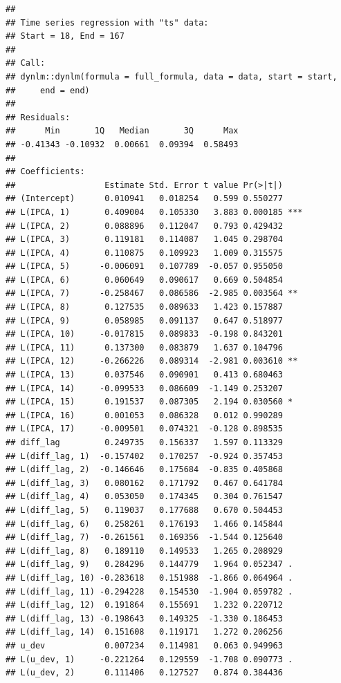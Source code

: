 \documentclass[
]{article}
\begin{document}
\begin{verbatim}
## 
## Time series regression with "ts" data:
## Start = 18, End = 167
## 
## Call:
## dynlm::dynlm(formula = full_formula, data = data, start = start, 
##     end = end)
## 
## Residuals:
##      Min       1Q   Median       3Q      Max 
## -0.41343 -0.10932  0.00661  0.09394  0.58493 
## 
## Coefficients:
##                  Estimate Std. Error t value Pr(>|t|)    
## (Intercept)      0.010941   0.018254   0.599 0.550277    
## L(IPCA, 1)       0.409004   0.105330   3.883 0.000185 ***
## L(IPCA, 2)       0.088896   0.112047   0.793 0.429432    
## L(IPCA, 3)       0.119181   0.114087   1.045 0.298704    
## L(IPCA, 4)       0.110875   0.109923   1.009 0.315575    
## L(IPCA, 5)      -0.006091   0.107789  -0.057 0.955050    
## L(IPCA, 6)       0.060649   0.090617   0.669 0.504854    
## L(IPCA, 7)      -0.258467   0.086586  -2.985 0.003564 ** 
## L(IPCA, 8)       0.127535   0.089633   1.423 0.157887    
## L(IPCA, 9)       0.058985   0.091137   0.647 0.518977    
## L(IPCA, 10)     -0.017815   0.089833  -0.198 0.843201    
## L(IPCA, 11)      0.137300   0.083879   1.637 0.104796    
## L(IPCA, 12)     -0.266226   0.089314  -2.981 0.003610 ** 
## L(IPCA, 13)      0.037546   0.090901   0.413 0.680463    
## L(IPCA, 14)     -0.099533   0.086609  -1.149 0.253207    
## L(IPCA, 15)      0.191537   0.087305   2.194 0.030560 *  
## L(IPCA, 16)      0.001053   0.086328   0.012 0.990289    
## L(IPCA, 17)     -0.009501   0.074321  -0.128 0.898535    
## diff_lag         0.249735   0.156337   1.597 0.113329    
## L(diff_lag, 1)  -0.157402   0.170257  -0.924 0.357453    
## L(diff_lag, 2)  -0.146646   0.175684  -0.835 0.405868    
## L(diff_lag, 3)   0.080162   0.171792   0.467 0.641784    
## L(diff_lag, 4)   0.053050   0.174345   0.304 0.761547    
## L(diff_lag, 5)   0.119037   0.177688   0.670 0.504453    
## L(diff_lag, 6)   0.258261   0.176193   1.466 0.145844    
## L(diff_lag, 7)  -0.261561   0.169356  -1.544 0.125640    
## L(diff_lag, 8)   0.189110   0.149533   1.265 0.208929    
## L(diff_lag, 9)   0.284296   0.144779   1.964 0.052347 .  
## L(diff_lag, 10) -0.283618   0.151988  -1.866 0.064964 .  
## L(diff_lag, 11) -0.294228   0.154530  -1.904 0.059782 .  
## L(diff_lag, 12)  0.191864   0.155691   1.232 0.220712    
## L(diff_lag, 13) -0.198643   0.149325  -1.330 0.186453    
## L(diff_lag, 14)  0.151608   0.119171   1.272 0.206256    
## u_dev            0.007234   0.114981   0.063 0.949963    
## L(u_dev, 1)     -0.221264   0.129559  -1.708 0.090773 .  
## L(u_dev, 2)      0.111406   0.127527   0.874 0.384436    

\end{verbatim}
\end{document}
